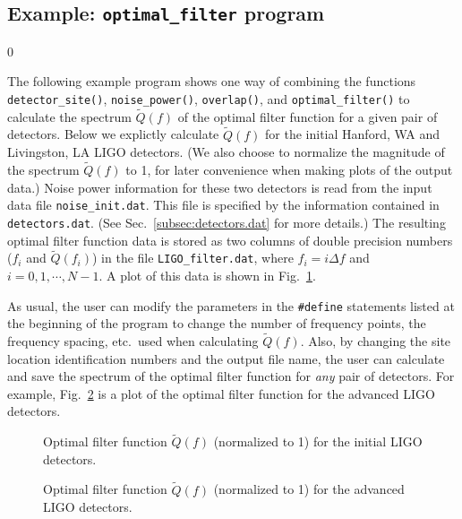 \subsection{Example: {\tt optimal\_filter} program}
\label{subsec:example_optimal_filter}
\setcounter{equation}0

The following example program shows one way of combining the functions
{\tt detector\_site()}, {\tt noise\_power()}, {\tt overlap()}, and 
{\tt optimal\_filter()} to calculate the spectrum $\tilde Q(f)$ of the
optimal filter function for a given pair of detectors.
Below we explictly calculate $\tilde Q(f)$ for the initial Hanford, WA
and Livingston, LA LIGO detectors.
(We also choose to normalize the magnitude of the spectrum 
$\tilde Q(f)$ to 1, for later convenience when making plots of the 
output data.)
Noise power information for these two detectors is read from the input
data file {\tt noise\_init.dat}.
This file is specified by the information contained in 
{\tt detectors.dat}.
(See Sec.~\ref{subsec:detectors.dat} for more details.)
The resulting optimal filter function data is stored as two
columns of double precision numbers ($f_i$ and $\tilde Q(f_i)$) in 
the file {\tt LIGO\_filter.dat}, where $f_i=i\Delta f$ and 
$i=0,1,\cdots,N-1$.
A plot of this data is shown in Fig.~\ref{f:f4a}.

As usual, the user can modify the parameters in the {\tt \#define}
statements listed at the beginning of the program to change the number 
of frequency points, the frequency spacing, etc.~used when calculating 
$\tilde Q(f)$.
Also, by changing the site location identification numbers 
and the output file name, the user can calculate and save the spectrum 
of the optimal filter function for {\it any} pair of detectors.
For example, Fig.~\ref{f:f4b} is a plot of the optimal filter function
for the advanced LIGO detectors.


\begin{figure}[h]
\begin{center}
{}
\caption{\label{f:f4a} 
Optimal filter function $\tilde Q(f)$ (normalized to 1) for the
initial LIGO detectors.}
\end{center}
\end{figure}

\begin{figure}[h]
\begin{center}
{}
\caption{\label{f:f4b} 
Optimal filter function $\tilde Q(f)$ (normalized to 1) for the
advanced LIGO detectors.}
\end{center}
\end{figure}

